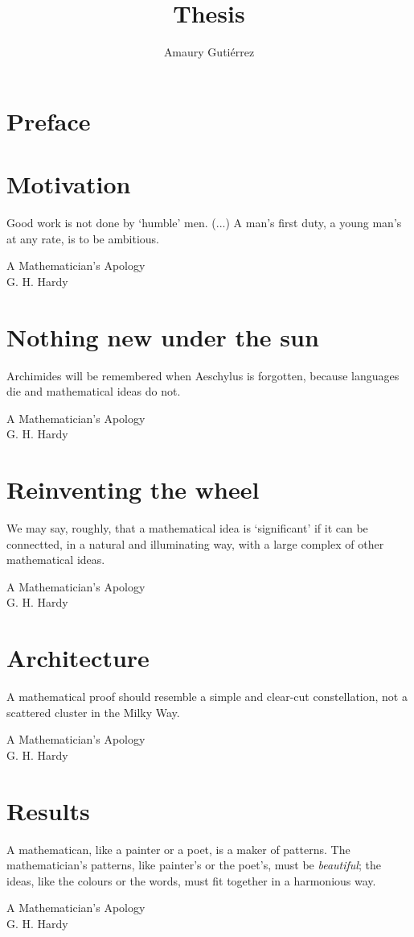 \documentclass[12pt,letterpaper]{book}
\author{Amaury Guti\'errez}
\title{Thesis}
\theoremstyle{definition} \newtheorem{definition}{Definición}[section]
\theoremstyle{plain} \newtheorem{theorem}{Teorema}[section]
\theoremstyle{plain} \newtheorem{lemma}{Lema}[section]
\theoremstyle{plain} \newtheorem{proposition}[theorem]{Proposici\'on}
\theoremstyle{plain} \newtheorem{corollary}[theorem]{Corolario}
\theoremstyle{plain} \newtheorem{remark}[theorem]{Comentario}
\begin{document}
\frontmatter
 



\tableofcontents

\mainmatter

\chapter{Preface}


\chapter{Motivation}
\epigraph{Good work is not done by `humble' men. (...) A man's first duty, a young man's at any rate, is to be ambitious.}{A Mathematician's Apology \\ G. H. Hardy}


\chapter{Nothing new under the sun}
\epigraph{Archimides will be remembered when Aeschylus is forgotten, because languages die and mathematical ideas do not.}{A Mathematician's Apology \\ G. H. Hardy}


\chapter{Reinventing the wheel}
\epigraph{We may say, roughly, that a mathematical idea is `significant' if it can be connectted, in a natural and illuminating way, with a large complex of other mathematical ideas.}{A Mathematician's Apology \\ G. H. Hardy}


\chapter{Architecture}
\epigraph{A mathematical proof should resemble a simple and clear-cut constellation, not a scattered cluster in the Milky Way.}{A Mathematician's Apology \\ G. H. Hardy}


\chapter{Results}
\epigraph{A mathematican, like a painter or a poet, is a maker of patterns. The mathematician's patterns, like painter's or the poet's, must be \emph{beautiful}; the ideas, like the colours or the words, must fit together in a harmonious way.}{A Mathematician's Apology \\ G. H. Hardy}

\end{document}
